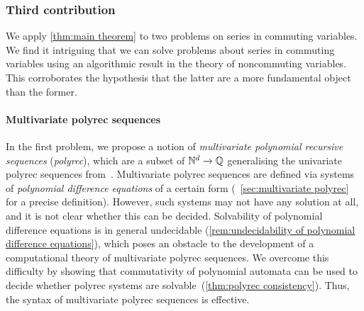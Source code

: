 \subsubsection*{Third contribution}
We apply \cref{thm:main theorem}
to two problems on series in commuting variables.
%
We find it intriguing that we can solve problems about series in commuting variables
using an algorithmic result in the theory of noncommuting variables.
%
This corroborates the hypothesis that the latter
are a more fundamental object than the former.

\paragraph{Multivariate polyrec sequences}
%
In the first problem, we propose a notion of \emph{multivariate polynomial recursive sequences} (\emph{polyrec}),
which are a subset of $\mathbb N^d \to \mathbb Q$ generalising the univariate polyrec sequences
from~\cite{Cadilhac:Mazowiecki:Paperman:Pilipczuk:Senizergues:ToCS:2021}.
%
Multivariate polyrec sequences are defined via systems of \emph{polynomial difference equations} of a certain form
(\cf~\cref{sec:multivariate polyrec} for a precise definition).
%
However, such systems may not have any solution at all,
and it is not clear whether this can be decided.
%
Solvability of polynomial difference equations is in general undecidable
(\cref{rem:undecidability of polynomial difference equations}),
which poses an obstacle to the development of a computational theory of multivariate polyrec sequences.
%
We overcome this difficulty by showing that commutativity of polynomial automata
can be used to decide whether polyrec systems are solvable~(\cref{thm:polyrec consistency}).
%
Thus, the syntax of multivariate polyrec sequences is effective.


